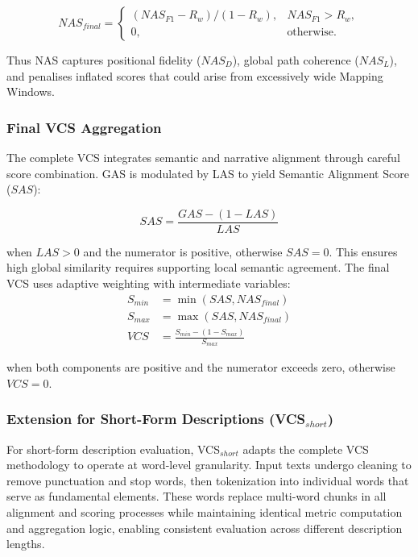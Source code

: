 \documentclass[main.tex]{subfiles}
\begin{document}
\begin{equation}
NAS_{final} = \begin{cases}
(NAS_{F1} - R_w)/(1 - R_w), & NAS_{F1} > R_w, \\
0, & \text{otherwise}.
\end{cases}
\end{equation}

Thus NAS captures positional fidelity ($NAS_D$), global path coherence ($NAS_L$), and penalises inflated scores that could arise from excessively wide Mapping Windows.

\subsubsection{Final VCS Aggregation}
The complete VCS integrates semantic and narrative alignment through careful score combination. GAS is modulated by LAS to yield Semantic Alignment Score ($SAS$):

\begin{equation} \label{eq:sas_revised} 
SAS = \frac{GAS - (1 - LAS)}{LAS}
\end{equation}

when $LAS > 0$ and the numerator is positive, otherwise $SAS = 0$. This ensures high global similarity requires supporting local semantic agreement. The final VCS uses adaptive weighting with intermediate variables:
\begin{align}
S_{min} &= \min(SAS, NAS_{final}) \label{eq:s_min} \\
S_{max} &= \max(SAS, NAS_{final}) \label{eq:s_max} \\
VCS &= \frac{S_{min} - (1 - S_{max})}{S_{max}} \label{eq:vcs_final}
\end{align}

when both components are positive and the numerator exceeds zero, otherwise $VCS = 0$.

\subsubsection{Extension for Short-Form Descriptions (VCS$_{short}$)}
For short-form description evaluation, VCS$_{short}$ adapts the complete VCS methodology to operate at word-level granularity. Input texts undergo cleaning to remove punctuation and stop words, then tokenization into individual words that serve as fundamental elements. These words replace multi-word chunks in all alignment and scoring processes while maintaining identical metric computation and aggregation logic, enabling consistent evaluation across different description lengths.
\end{document}
